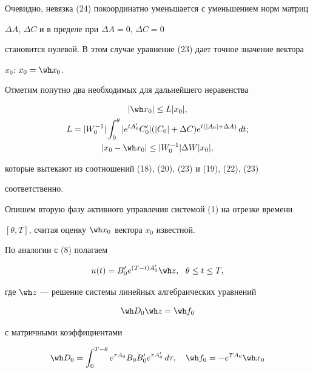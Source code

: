Очевидно, невязка (24) покоординатно уменьшается с уменьшением норм матриц


$\Delta A$, $\Delta C$ и в пределе при $\Delta A=0$, $\Delta C=0$


становится нулевой. В этом случае уравнение (23) дает точное значение вектора


$x_0$: $x_0=\wh x_0$.


Отметим попутно два необходимых для дальнейшего неравенства


\begin{gather}


|\wh x_0| \le L |x_0|, \\


%


L=|W_0^{-1}|\int_0^{\theta} | e^{t A_0'} C_0'|


( |C_0|+\Delta C )e^{ t (|A_0|+\Delta A)} \, d t;\notag\\


%


|x_0 - \wh x_0| \le |W_0^{-1}| \Delta W |x_0|,


\end{gather}


которые вытекают из соотношений (18), (20), (23) и (19), (22), (23)


соответственно.





Опишем вторую фазу активного управления системой (1) на отрезке времени


$[\theta, T]$, считая оценку $ \wh x_0$ вектора $x_0$ известной.


По аналогии с (8) полагаем


\begin{equation}


u(t)=B_0'e^{(T-t)A_0'} \wh z, \ \  \theta \le t \le T,


\end{equation} 


где $\wh z$ --- решение системы линейных алгебраических уравнений


\begin{equation}


\wh D_0 \wh z = \wh f_0


\end{equation}%


с матричными коэффициентами


\begin{equation}


\wh D_0=\int_0^{T-\theta} e^{\tau A_0}B_0 B_0'e^{\tau A_0'} \, d \tau,


\quad \wh f_0 = - e^{T A_0}\wh x_0


\end{equation}


